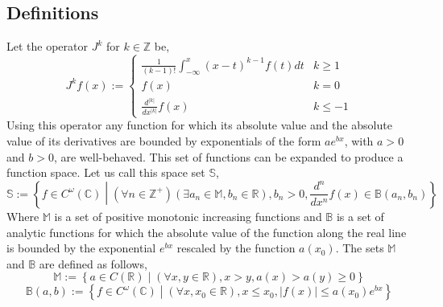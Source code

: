 \documentclass[%
 onecolumn,
 amsmath, amssymb, aps, pra, 10pt
]{revtex4-2}
\begin{document}
\subsection{Definitions}
Let the operator $J^k$ for $k \in \mathbb{Z}$ be,
\[ J^k f(x) := \begin{cases} \frac{1}{(k-1)!}\int_{-\infty}^x (x - t)^{k - 1}f(t)dt & k \geq 1 \\ f(x) & k = 0 \\ \frac{d^{\left|k\right|}}{dx^{\left|k\right|}}f(x) & k \leq -1 \end{cases} \]
Using this operator any function for which its absolute value and the absolute value of its derivatives are bounded by exponentials of the form $ae^{bx}$, with $a > 0$ and $b > 0$, are well-behaved. This set of functions can be expanded to produce a function space. Let us call this space set $\mathbb{S}$,
\[ \mathbb{S} := \left\lbrace f \in C^\omega(\mathbb{C}) \middle| (\forall n \in \mathbb{Z}^+)(\exists a_n \in \mathbb{M}, b_n \in \mathbb{R}), b_n > 0, \frac{d^n}{dx^n}f(x) \in \mathbb{B}(a_n, b_n) \right\rbrace \]
Where $\mathbb{M}$ is a set of positive monotonic increasing functions and $\mathbb{B}$ is a set of analytic functions for which the absolute value of the function along the real line is bounded by the exponential $e^{bx}$ rescaled by the function $a(x_0)$. The sets $\mathbb{M}$ and $\mathbb{B}$ are defined as follows,
\[\mathbb{M} := \left\lbrace a \in C(\mathbb{R}) \middle| (\forall x, y \in \mathbb{R}), x > y, a(x) > a(y) \geq 0 \right\rbrace\]
\[\mathbb{B}(a, b) := \left\lbrace f \in C^\omega(\mathbb{C}) \middle| (\forall x, x_0 \in \mathbb{R}), x \leq x_0, |f(x)| \leq a(x_0)e^{bx} \right\rbrace\]
\end{document}
